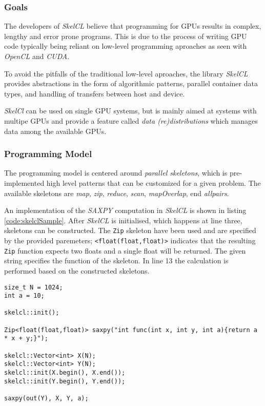 \subsubsection{Goals}
The developers of \textit{SkelCL} believe that programming for GPUs results in complex, lengthy and error prone programs. This is due to the process of writing GPU code typically being reliant on low-level programming aproaches as seen with \textit{OpenCL} and \textit{CUDA}. 

To avoid the pitfalls of the traditional low-level aproaches, the library \textit{SkelCL} provides abstractions in the form of algorithmic patterns, parallel container data types, and handling of transfers between host and device. 

\textit{SkelCl} can be used on single GPU systems, but is mainly aimed at systems with multipe GPUs and provide a feature called \textit{data (re)distributions} which manages data among the available GPUs.

\subsubsection{Programming Model}
The programming model is centered around \textit{parallel skeletons}, which is pre-implemented high level patterns that can be customized for a given problem. The available skeletons are \textit{map}, \textit{zip}, \textit{reduce}, \textit{scan}, \textit{mapOverlap}, end \textit{allpairs}.

An implementation of the \textit{SAXPY} computation in \textit{SkelCL} is shown in listing \ref{code:skelclSample}. After \textit{SkelCL} is initialised, which happens at line three, skeletons can be constructed. The \texttt{Zip} skeleton have been used and are specified by the provided paremeters; \texttt{<float(float,float)>} indicates that the resulting \texttt{Zip} function expects two floats and a single float will be returned. The given string specifies the function of the skeleton. In line 13 the calculation is performed based on the constructed skeletons.

\begin{lstlisting}[caption={The \textit{SAXPY} computation in \textit{SkelCL}.}, label=code:skelclSample] 
size_t N = 1024;
int a = 10;

skelcl::init();

Zip<float(float,float)> saxpy("int func(int x, int y, int a){return a * x + y;}");

skelcl::Vector<int> X(N);      
skelcl::Vector<int> Y(N);
skelcl::init(X.begin(), X.end()); 
skelcl::init(Y.begin(), Y.end());

saxpy(out(Y), X, Y, a);
\end{lstlisting}

